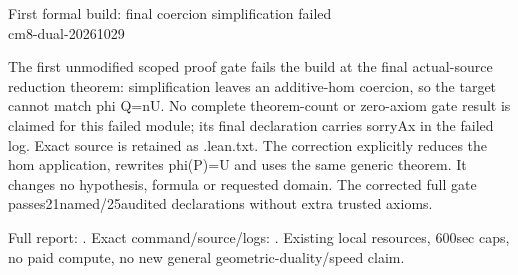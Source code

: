 \documentclass[10pt]{article}
\begin{document}
\begin{center}{\Large First formal build: final coercion simplification failed}\\cm8-dual-20261029\end{center}
The first unmodified scoped proof gate fails the build at the final actual-source
reduction theorem: simplification leaves an additive-hom coercion, so the target
cannot match phi Q=nU. No complete theorem-count or zero-axiom gate result is
claimed for this failed module; its final declaration carries sorryAx in the
failed log. Exact source is retained as .lean.txt. The correction explicitly
reduces the hom application, rewrites phi(P)=U and uses the same generic theorem.
It changes no hypothesis, formula or requested domain. The corrected full gate
passes21named/25audited declarations without extra trusted axioms.
\par
{}\par
Full report: . Exact command/source/logs:
. Existing local resources,
600sec caps, no paid compute, no new general geometric-duality/speed claim.
\end{document}
